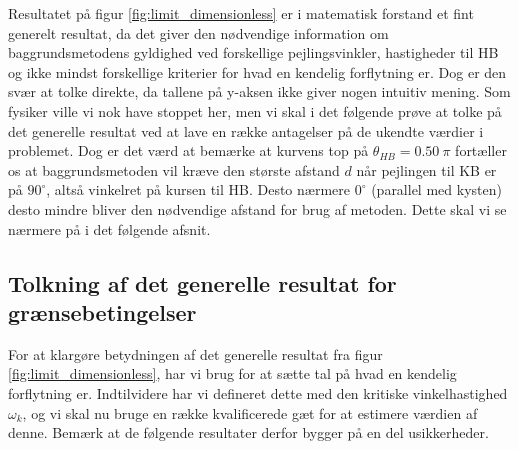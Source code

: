 \documentclass[%
 reprint,
nofootinbib,
aps,
]{revtex4-1}
\begin{document}
Resultatet på figur \ref{fig:limit_dimensionless} er i matematisk forstand et fint generelt resultat, da det giver den nødvendige information om baggrundsmetodens gyldighed ved forskellige pejlingsvinkler, hastigheder til HB og ikke mindst forskellige kriterier for hvad en kendelig forflytning er. Dog er den svær at tolke direkte, da tallene på y-aksen ikke giver nogen intuitiv mening. Som fysiker ville vi nok have stoppet her, men vi skal i det følgende prøve at tolke på det generelle resultat ved at lave en række antagelser på de ukendte værdier i problemet. Dog er det værd at bemærke at kurvens top på $\theta_{HB} = 0.50 \ \pi$ fortæller os at baggrundsmetoden vil kræve den største afstand $d$ når pejlingen til KB er på $90^{\circ}$, altså vinkelret på kursen til HB. Desto nærmere $0^{\circ}$ (parallel med kysten) desto mindre bliver den nødvendige afstand for brug af metoden. Dette skal vi se nærmere på i det følgende afsnit.

\subsection{Tolkning af det generelle resultat for grænsebetingelser}
For at klargøre betydningen af det generelle resultat fra figur \ref{fig:limit_dimensionless}, har vi brug for at sætte tal på hvad en kendelig forflytning er. Indtilvidere har vi defineret dette med den kritiske vinkelhastighed $\omega_k$, og vi skal nu bruge en række kvalificerede gæt for at estimere værdien af denne. Bemærk at de følgende resultater derfor bygger på en del usikkerheder.
\end{document}
